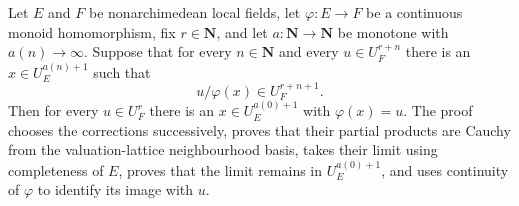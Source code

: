 \begin{theorem}\label{mod:localfield-successivelifting}
Let $E$ and $F$ be nonarchimedean local fields, let
$\varphi:E\to F$ be a continuous monoid homomorphism, fix
$r\in\mathbf N$, and let $a:\mathbf N\to\mathbf N$ be monotone with
$a(n)\to\infty$.  Suppose that for every $n\in\mathbf N$ and every
$u\in U_F^{r+n}$ there is an $x\in U_E^{a(n)+1}$ such that
\[
  u/\varphi(x)\in U_F^{r+n+1}.
\]
Then for every $u\in U_F^r$ there is an $x\in U_E^{a(0)+1}$ with
$\varphi(x)=u$.
\leanok
{}
\FormalizationContract The proof chooses the corrections successively, proves that their
partial products are Cauchy from the valuation-lattice neighbourhood basis, takes their limit
using completeness of $E$, proves that the limit remains in $U_E^{a(0)+1}$, and uses continuity
of $\varphi$ to identify its image with $u$.
\end{theorem}
